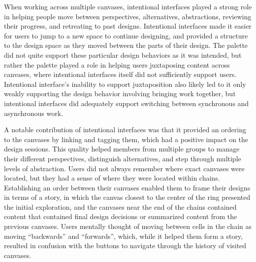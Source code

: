 \documentclass[12pt,fleqn]{ucithesis}
\begin{document}
When working across multiple canvases, intentional interfaces played a strong role in helping people move between perspectives, alternatives, abstractions, reviewing their progress, and retreating to past designs. Intentional interfaces made it easier for users to jump to a new space to continue designing, and provided a structure to the design space as they moved between the parts of their design. The palette did not quite support these particular design behaviors as it was intended, but rather the palette played a role in helping users juxtaposing content across canvases, where intentional interfaces itself did not sufficiently support users. Intentional interface's inability to support juxtaposition also likely led to it only weakly supporting the design behavior involving bringing work together, but intentional interfaces did adequately support switching between synchronous and asynchronous work. 


A notable contribution of intentional interfaces was that it provided an ordering to the canvases by linking and tagging them, which had a positive impact on the design sessions. This quality helped members from multiple groups to manage their different perspectives, distinguish alternatives, and step through multiple levels of abstraction. Users did not always remember where exact canvases were located, but they had a sense of where they were located within chains. Establishing an order between their canvases enabled them to frame their designs in terms of a story, in which the canvas closest to the center of the ring presented the initial exploration, and the canvases near the end of the chains contained content that contained final design decisions or summarized content from the previous canvases. Users mentally thought of moving between cells in the chain as moving ``backwards'' and ``forwards'', which, while it helped them form a story, resulted in confusion with the buttons to navigate through the history of visited canvases.
\end{document}
